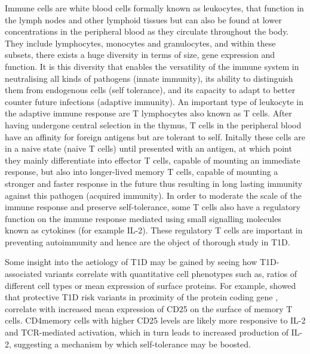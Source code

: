 Immune cells are white blood cells formally known as leukocytes, that function in the lymph nodes
and other lymphoid tissues but can also be found at lower concentrations in the peripheral blood as they circulate throughout the body.
They include lymphocytes, monocytes and granulocytes, and within these subsets, there exists a huge diversity in terms of size, gene expression and function.
It is this diversity that enables the versatility of the immune system in neutralising all kinds of pathogens (innate immunity),
its ability to distinguish them from endogenous cells (self tolerance),
and its capacity to adapt to better counter future infections (adaptive immunity).
An important type of leukocyte in the adaptive immune response are T lymphocytes also known as T cells.
After having undergone central selection in the thymus,
T cells in the peripheral blood have an affinity for foreign antigens but are tolerant to self.
Initally these cells are in a naive state (naive T cells) until presented with an antigen,
at which point they mainly differentiate into effector T cells, capable of mounting an immediate response,
but also into longer-lived memory T cells, capable of mounting a stronger and faster response in the future thus
resulting in long lasting immunity against this pathogen (acquired immunity).
In order to moderate the scale of the immune response and preserve self-tolerance, some T cells also have a regulatory function on the immune response
mediated using small signalling molecules known as cytokines (for example \acrfull{IL-2}).
These regulatory T cells are important in preventing autoimmunity and hence are the object of thorough study in T1D.

Some insight into the aetiology of T1D may be gained by seeing how T1D-associated variants correlate with quantitative cell phenotypes such as, 
ratios of different cell types or mean expression of surface proteins.
For example, \citet{Dendrou:2009dv} showed that protective T1D risk variants in proximity of the protein coding gene ,
correlate with increased mean expression of CD25 on the surface of memory T cells.
CD4\positive memory cells with higher CD25 levels are likely more responsive to IL-2 and TCR-mediated activation,
which in turn leads to increased production of IL-2, suggesting a mechanism by which self-tolerance may be boosted.


